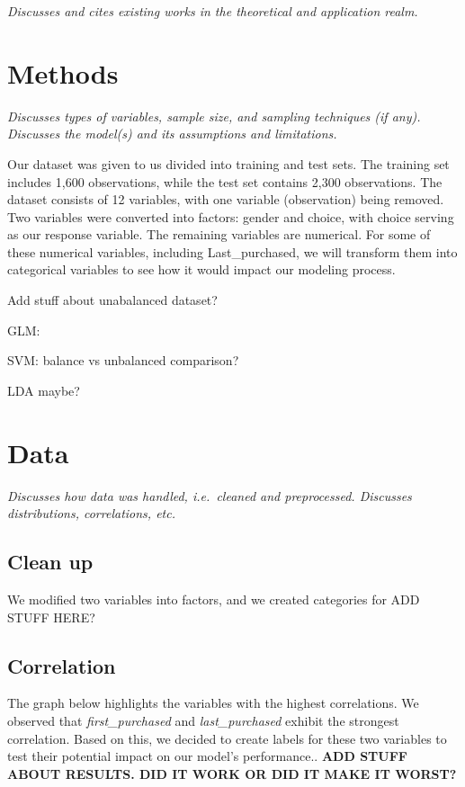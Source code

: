 \documentclass[
]{article}
\begin{document}
\emph{Discusses and cites existing works in the theoretical and
application realm.}

\hypertarget{methods}{%
\section{Methods}\label{methods}}

\emph{Discusses types of variables, sample size, and sampling techniques
(if any). Discusses the model(s) and its assumptions and limitations.}

Our dataset was given to us divided into training and test sets. The
training set includes 1,600 observations, while the test set contains
2,300 observations. The dataset consists of 12 variables, with one
variable (observation) being removed. Two variables were converted into
factors: gender and choice, with choice serving as our response
variable. The remaining variables are numerical. For some of these
numerical variables, including Last\_purchased, we will transform them
into categorical variables to see how it would impact our modeling
process.

Add stuff about unabalanced dataset?

GLM:

SVM: balance vs unbalanced comparison?

LDA maybe?

\hypertarget{data}{%
\section{Data}\label{data}}

\emph{Discusses how data was handled, i.e.~cleaned and preprocessed.
Discusses distributions, correlations, etc.}

\hypertarget{clean-up}{%
\subsection{Clean up}\label{clean-up}}

We modified two variables into factors, and we created categories for
ADD STUFF HERE?

\hypertarget{correlation}{%
\subsection{Correlation}\label{correlation}}

The graph below highlights the variables with the highest correlations.
We observed that \emph{first\_purchased} and \emph{last\_purchased}
exhibit the strongest correlation. Based on this, we decided to create
labels for these two variables to test their potential impact on our
model's performance.. \textbf{ADD STUFF ABOUT RESULTS. DID IT WORK OR
DID IT MAKE IT WORST?}
\end{document}

